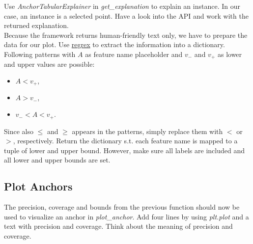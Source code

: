 \documentclass[a4paper]{article}
\begin{document}
Use \textit{AnchorTabularExplainer} in \textit{get\_explanation} to explain an instance. In our case, an instance is a selected point. Have a look into the API and work with the returned explanation.\\

\noindent Because the framework returns human-friendly text only, we have to prepare the data for our plot. Use \href{https://docs.python.org/3/howto/regex.html}{regrex} to extract the information into a dictionary. Following patterns with $A$ as feature name placeholder and $v_-$ and $v_+$ as lower and upper values are possible:

\begin{itemize}
    \item $A < v_+$,
    \item $A > v_-$,
    \item $v_- < A < v_+$.
\end{itemize}

\noindent Since also $\leq$ and $\geq$ appears in the patterns, simply replace them with $<$ or $>$, respectively. Return the dictionary s.t. each feature name is mapped to a tuple of lower and upper bound. However, make sure all labels are included and all lower and upper bounds are set.


\subsection{Plot Anchors}

The precision, coverage and bounds from the previous function should now be used to visualize an anchor in \textit{plot\_anchor}. Add four lines by using \textit{plt.plot} and a text with precision and coverage. Think about the meaning of precision and coverage.
\end{document}

